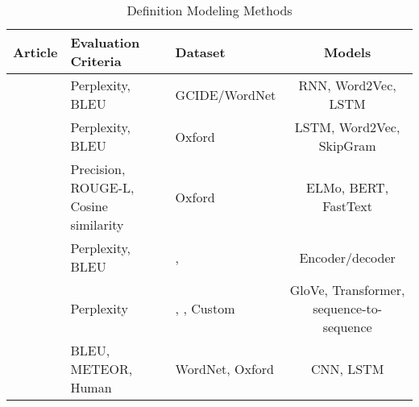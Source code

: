 \begin{longtable}{|c|p{3.5cm}|p{3.5cm}|c|}
    
    \caption{Definition Modeling Methods}\label{tab:datasets_task}                                                                                                                                                                                                                              \\
    \hline
    Article                              & Evaluation Criteria                                              & Dataset                                                                                                         & Models                                   \\
    \hline
    \cite{noraset_definition_2016}       & Perplexity, BLEU                                                 & GCIDE/WordNet                                                                                                   & RNN,  Word2Vec, LSTM                     \\
    \hline
    \cite{gadetsky_conditional_2018}     & Perplexity, BLEU                                                 & Oxford                                                                                                          & LSTM, Word2Vec, SkipGram                 \\
    \hline
    \cite{chang_what_2019}               & Precision,    ROUGE-L, Cosine similarity                         & Oxford                                                                                                          & ELMo, BERT, FastText                     \\
    \hline
    \cite{washio_bridging_2019}          & Perplexity, BLEU                                                 & \cite{noraset_definition_2016}, \cite{gadetsky_conditional_2018}                                                & Encoder/decoder                          \\
    \hline
    \cite{mickus_mark_2019}              & Perplexity                                                       & \cite{noraset_definition_2016}, \cite{gadetsky_conditional_2018}, Custom                                        & GloVe, Transformer, sequence-to-sequence \\
    \hline
    \cite{li_explicit_2020}              & BLEU, METEOR, Human                                              & WordNet, Oxford                                                                                                 & CNN, LSTM                                \\

\end{longtable}
